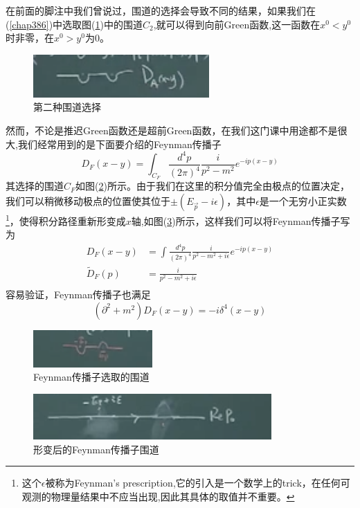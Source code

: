 在前面的脚注中我们曾说过，围道的选择会导致不同的结果，如果我们在(\ref{chap386})中选取图(\ref{fig3_2})中的围道$C_{2}$,就可以得到向前Green函数,这一函数在$x^{0}<y^{0}$时非零，在$x^{0}>y^{0}$为0。
\begin{figure}[htbp]
    \centering
    \includegraphics{img/chap3_2.png}
    \caption{第二种围道选择}
    \label{fig3_2}
\end{figure}
然而，不论是推迟Green函数还是超前Green函数，在我们这门课中用途都不是很大,我们经常用到的是下面要介绍的Feynman传播子
\begin{equation}
    D_{F}(x-y)=\int_{C_{F}} \frac{d^{4}p}{(2\pi)^{4}}\frac{i}{p^{2}-m^{2}}e^{-ip(x-y)}
\end{equation}
其选择的围道$C_{F}$如图(\ref{fig3_3})所示。由于我们在这里的积分值完全由极点的位置决定，我们可以稍微移动极点的位置使其位于$\pm(E_{\vec{p}}-i\epsilon)$，其中$\epsilon$是一个无穷小正实数\footnote{这个$\epsilon$被称为Feynman's prescription,它的引入是一个数学上的trick，在任何可观测的物理量结果中不应当出现,因此其具体的取值并不重要。}，使得积分路径重新形变成$x$轴,如图(\ref{fig3_4})所示，这样我们可以将Feynman传播子写为
\begin{equation}
\begin{aligned}
     D_{F}(x-y)&=\int \frac{d^{4}p}{(2\pi)^{4}}\frac{i}{p^{2}-m^{2}+i\epsilon}e^{-ip(x-y)}\\
     \widetilde{D}_{F}(p)&=\frac{i}{p^{2}-m^{2}+i\epsilon}\\
     \end{aligned}
\end{equation}
容易验证，Feynman传播子也满足
\begin{equation}
    (\partial^{2}+m^{2})D_{F}(x-y)=-i\delta^{4}(x-y)
\end{equation}
\begin{figure}[htbp]
    \centering
    \includegraphics{img/chap3_3.png}
    \caption{Feynman传播子选取的围道}
    \label{fig3_3}
\end{figure}

\begin{figure}[htbp]
    \centering
    \includegraphics{img/chap3_4.png}
    \caption{形变后的Feynman传播子围道}
    \label{fig3_4}
\end{figure}

